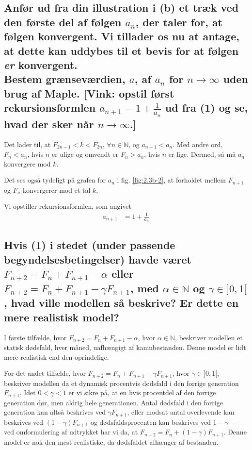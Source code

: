 \documentclass[11pt,a4paper]{article}
\newcommand{\figref}[1]{fig. \ref{fig:#1}}
\begin{document}
\subsection
{
    \mdseries
    Anfør ud fra din illustration i (b) et træk ved den første del af følgen
    ${a_n}$, der taler for, at følgen konvergent. Vi tillader os nu at
    antage, at dette kan uddybes til et bevis for at følgen {\it er}
    konvergent.
    \\\indent
    Bestem grænseværdien, $a$, af $a_n$ for $n \rightarrow \infty$ uden brug
    af Maple. [Vink: opstil først rekursionsformlen $a_{n+1} = 1 +
    \frac{1}{a_n}$ ud fra (1) og se, hvad der sker når $n \rightarrow
    \infty$.]
}
Det lader til, at $F_{2n - 1} < k < F_{2n}$, $\forall n \in \mathbb{N}$, og
$a_{n+1} < a_n$. Med andre ord, $F_n < a_n$, hvis $n$ er ulige og omvendt er
$F_n > a_n$, hvis $n$ er lige. Dermed, så må $a_n$ konvergere mod $k$.

Det ses også tydeligt på grafen for $a_n$ i \figref{2.3b-2}, at forholdet
mellem $F_{n+1}$ og $F_n$ konvergerer mod et tal $k$.

Vi opstiller rekursionsformlen, som angivet
\begin{align}
    a_{n+1} &= 1 + \frac{1}{a_n}
\end{align}

\subsection
{
    \mdseries
    Hvis (1) i stedet (under passende begyndelsesbetingelser) havde været
    $F_{n+2} = F_n + F_{n+1} - \alpha$ eller $F_{n+2} = F_n + F_{n+1} -
    \gamma F_{n+1}$, med $\alpha \in \mathbb{N}$ og $\gamma \in ]0,1[$,
    hvad ville modellen så beskrive? Er dette en mere realistisk model?
}
I første tilfælde, hvor $F_{n+2} = F_n + F_{n+1} - \alpha$, hvor $\alpha \in
\mathbb{N}$, beskriver modellen et statisk dødsfald, hver måned, uafhængigt
af kaninbestanden. Denne model er lidt mere realistisk end den oprindelige.

For det andet tilfælde, hvor $F_{n+2} = F_n + F_{n+1} - \gamma F_{n+1}$,
hvor $\gamma \in ]0,1[$, beskriver modellen da et dynamisk procentvis
dødsfald i den forrige generation $F_{n+1}$. Idet $0 < \gamma < 1$ er vi
sikre på, at en hvis procentdel af den forrige generation dør, men aldrig
hele generationen. Antal dødsfald i den forrige generation kan altså
beskrives ved $\gamma F_{n+1}$, eller modsat antal overlevende kan beskrives
ved $(1 - \gamma) F_{n+1}$ og dødsfaldsprocenten kan beskrives ved $1 -
\gamma$ --- ved omformulering af udtrykket har vi da, at $F_{n+2} = F_n + (1
- \gamma) F_{n+1}$. Denne model er nok den mest realistiske, da dødsfaldet
afhænger af bestanden.
\end{document}
